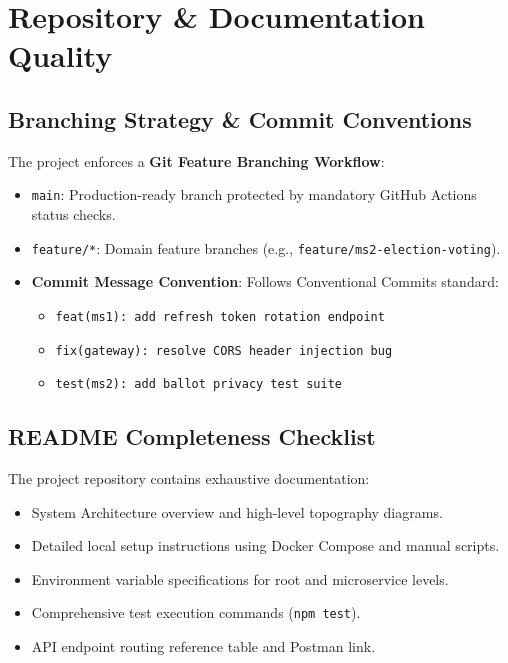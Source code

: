 \documentclass[12pt, a4paper]{article}
\begin{document}
\section{Repository \& Documentation Quality}

\subsection{Branching Strategy \& Commit Conventions}
The project enforces a \textbf{Git Feature Branching Workflow}:
\begin{itemize}
    \item \texttt{main}: Production-ready branch protected by mandatory GitHub Actions status checks.
    \item \texttt{feature/*}: Domain feature branches (e.g., \texttt{feature/ms2-election-voting}).
    \item \textbf{Commit Message Convention}: Follows Conventional Commits standard:
    \begin{itemize}
        \item \texttt{feat(ms1): add refresh token rotation endpoint}
        \item \texttt{fix(gateway): resolve CORS header injection bug}
        \item \texttt{test(ms2): add ballot privacy test suite}
    \end{itemize}
\end{itemize}

\subsection{README Completeness Checklist}
The project repository contains exhaustive documentation:
\begin{itemize}
    \item[\checkmark] System Architecture overview and high-level topography diagrams.
    \item[\checkmark] Detailed local setup instructions using Docker Compose and manual scripts.
    \item[\checkmark] Environment variable specifications for root and microservice levels.
    \item[\checkmark] Comprehensive test execution commands (\texttt{npm test}).
    \item[\checkmark] API endpoint routing reference table and Postman link.
\end{itemize}
\end{document}
